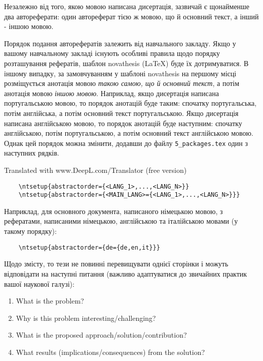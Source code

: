 
Незалежно від того, якою мовою написана дисертація, зазвичай є щонайменше два автореферати: один автореферат тією ж мовою, що й основний текст, а інший - іншою мовою.

Порядок подання авторефератів залежить від навчального закладу.  Якщо у вашому навчальному закладі існують особливі правила щодо порядку розташування рефератів, шаблон \gls{novathesis} (\LaTeX) буде їх дотримуватися.  В іншому випадку, за замовчуванням у шаблоні \gls{novathesis} на першому місці розміщується анотація мовою \emph{такою самою, що й основний текст}, а потім анотація мовою \emph{іншою мовою}. Наприклад, якщо дисертація написана португальською мовою, то порядок анотацій буде таким: спочатку португальська, потім англійська, а потім основний текст португальською. Якщо дисертація написана англійською мовою, то порядок анотацій буде наступним: спочатку англійською, потім португальською, а потім основний текст англійською мовою.
%
Однак цей порядок можна змінити, додавши до файлу \verb+5_packages.tex+ один з наступних рядків.

Translated with www.DeepL.com/Translator (free version)

\begin{verbatim}
    \ntsetup{abstractorder={<LANG_1>,...,<LANG_N>}}
    \ntsetup{abstractorder={<MAIN_LANG>={<LANG_1>,...,<LANG_N>}}}
\end{verbatim}

Наприклад, для основного документа, написаного німецькою мовою, з рефератами, написаними німецькою, англійською та італійською мовами (у такому порядку):

\begin{verbatim}
    \ntsetup{abstractorder={de={de,en,it}}}
\end{verbatim}

Щодо змісту, то тези не повинні перевищувати однієї сторінки і можуть відповідати на наступні питання (важливо адаптуватися до звичайних практик вашої наукової галузі):

\begin{enumerate}
  \item What is the problem?
  \item Why is this problem interesting/challenging?
  \item What is the proposed approach/solution/contribution?
  \item What results (implications/consequences) from the solution?
\end{enumerate}

